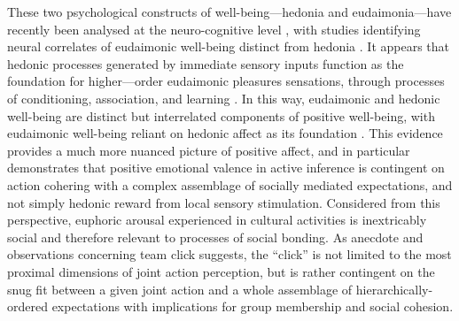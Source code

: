 \begin{CJK}{UTF8}{gbsn}
These two psychological constructs of well-being---hedonia and eudaimonia---have recently been analysed at the neuro-cognitive level \citep{Berridge2011}, with studies identifying neural correlates of eudaimonic well-being distinct from hedonia \citep{Lewis2014}. It appears that hedonic processes generated by immediate sensory inputs function as the foundation for higher—order eudaimonic pleasures sensations, through processes of conditioning, association, and learning \citep{Berridge2003}.  In this way, eudaimonic and hedonic well-being are distinct but interrelated components of positive well-being, with eudaimonic well-being reliant on hedonic affect as its foundation \citep{Berridge2011}. This evidence provides a much more nuanced picture of positive affect, and in particular demonstrates that positive emotional valence in active inference is contingent on action cohering with a complex assemblage of socially mediated expectations, and not simply hedonic reward from local sensory stimulation.  Considered from this perspective, euphoric arousal experienced in cultural activities is inextricably social and therefore relevant to processes of social bonding.
As anecdote and observations concerning team click suggests, the ``click'' is not limited to the most proximal dimensions of joint action perception, but is rather contingent on the snug fit between a given joint action and a whole assemblage of hierarchically-ordered expectations with implications for group membership and social cohesion.


\end{CJK}

